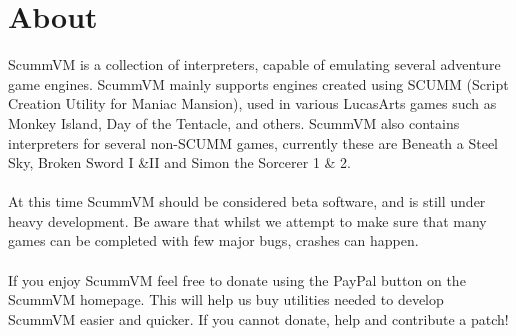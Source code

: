 


\section{About}

ScummVM is a collection of interpreters, capable of emulating several
adventure game engines. ScummVM mainly supports engines created using 
SCUMM (Script Creation Utility for Maniac Mansion), used in various
LucasArts games such as Monkey Island, Day of the Tentacle, and others.
ScummVM also contains interpreters for several non-SCUMM games, currently
these are Beneath a Steel Sky, Broken Sword I \&II and Simon the Sorcerer 1 \& 2.\\
\quad \\
At this time ScummVM should be considered beta software, and is still
under heavy development. Be aware that whilst we attempt to make sure
that many games can be completed with few major bugs, crashes can happen.\\
\quad \\
If you enjoy ScummVM feel free to donate using the PayPal button on the
ScummVM homepage. This will help us buy utilities needed to develop ScummVM
easier and quicker. If you cannot donate, help and contribute a patch!